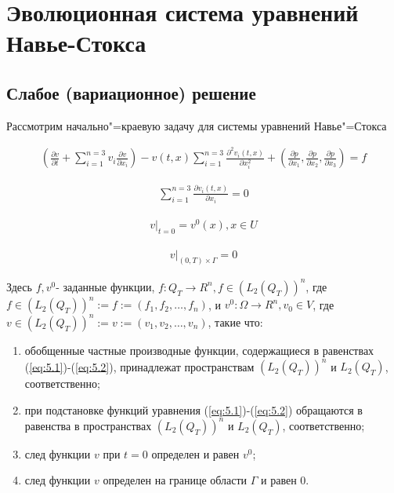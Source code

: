 \section{Эволюционная система уравнений \\Навье-Стокса}
\subsection {Слабое (вариационное) решение}
Рассмотрим начально"=краевую задачу для системы уравнений Навье"=Стокса

\begin{equation}\label{eq:5.1}
    \begin{gathered}
        (\frac{\partial v}{\partial t}+\sum_{i=1}^{n=3}v_i\frac{\partial v}{\partial x_i})-v(t,x)\sum_{i=1}^{n=3}\frac{\partial^2 v_i(t,x)}{\partial x^{2}_i}+(\frac{\partial p}{\partial x_1},\frac{\partial p}{\partial x_2},\frac{\partial p}{\partial x_3})=f
    \end{gathered}
\end{equation}

\begin{equation}\label{eq:5.2}
    \begin{gathered}
        \sum_{i=1}^{n=3}\frac{\partial v_i(t,x)}{\partial x_i}=0
    \end{gathered}
\end{equation}

\begin{equation}\label{eq:5.3}
    \begin{gathered}
        v|_{t=0}=v^{0}(x), x\in U
    \end{gathered}
\end{equation}

\begin{equation}\label{eq:5.4}
    \begin{gathered}
        v|_{(0,T)\times\Gamma}=0
    \end{gathered}
\end{equation}

Здесь $f,v^0$- заданные функции, $f:Q_T\rightarrow R^n, f\in (L_2(Q_T))^n$, где $f\in (L_2(Q_T))^n:={f:=(f_1,f_2,\dots,f_n)}$, и $v^0:\Omega\rightarrow R^n,v_0\in V$, где $v\in (L_2(Q_T))^n:={v:=(v_1,v_2,\dots,v_n)}$, такие что:
\begin{enumerate} 
    \item обобщенные частные производные функции, содержащиеся в равенствах (\ref{eq:5.1})-(\ref{eq:5.2}), принадлежат пространствам $(L_2(Q_T))^n$ и $L_2(Q_T)$, соответственно;
    \item при подстановке функций уравнения (\ref{eq:5.1})-(\ref{eq:5.2}) обращаются в равенства в пространствах $(L_2(Q_T))^n$ и $L_2(Q_T)$, соответственно;
    \item след функции $v$ при $t=0$ определен и равен $v^0$;
    \item след функции $v$ определен на границе области $\Gamma$ и равен 0.
\end{enumerate}

